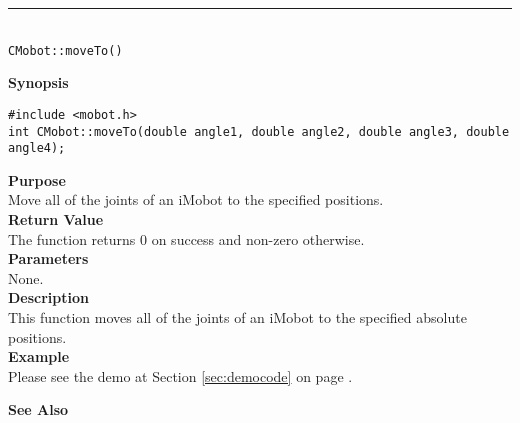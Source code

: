 \noindent
\vspace{5pt}
\rule{4.5in}{0.015in}\\
\noindent
{\LARGE \texttt{CMobot::moveTo()}}\\
{}

\noindent
{\bf Synopsis}\\
\begin{verbatim}
#include <mobot.h>
int CMobot::moveTo(double angle1, double angle2, double angle3, double angle4);
\end{verbatim}

\noindent
{\bf Purpose}\\
Move all of the joints of an iMobot to the specified positions.\\

\noindent
{\bf Return Value}\\
The function returns 0 on success and non-zero otherwise.\\

\noindent
{\bf Parameters}\\
None.\\

\noindent
{\bf Description}\\
This function moves all of the joints of an iMobot to the specified absolute positions. \\

\noindent
{\bf Example}\\
Please see the demo at Section \ref{sec:democode} on page \pageref{sec:democode}.\\
\noindent

\noindent
{\bf See Also}\\

